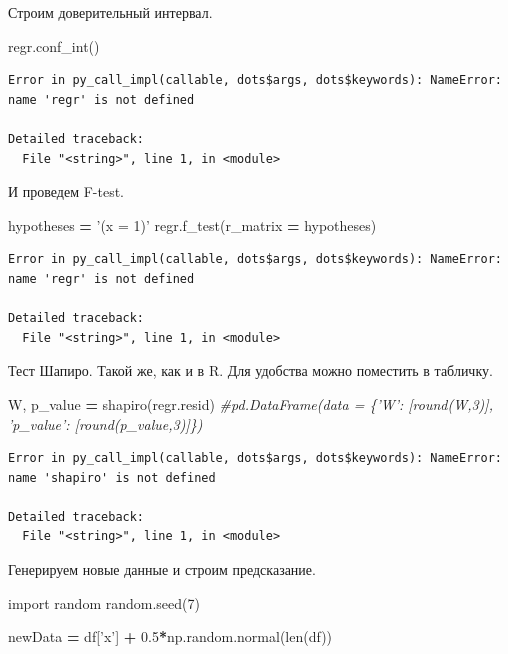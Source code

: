 \documentclass[]{book}
\newenvironment{Shaded}{\begin{snugshade}}{\end{snugshade}}
\newcommand{\BuiltInTok}[1]{#1}
\newcommand{\CommentTok}[1]{\textcolor[rgb]{0.56,0.35,0.01}{\textit{#1}}}
\newcommand{\DecValTok}[1]{\textcolor[rgb]{0.00,0.00,0.81}{#1}}
\newcommand{\FloatTok}[1]{\textcolor[rgb]{0.00,0.00,0.81}{#1}}
\newcommand{\ImportTok}[1]{#1}
\newcommand{\NormalTok}[1]{#1}
\newcommand{\OperatorTok}[1]{\textcolor[rgb]{0.81,0.36,0.00}{\textbf{#1}}}
\newcommand{\StringTok}[1]{\textcolor[rgb]{0.31,0.60,0.02}{#1}}
\begin{document}
Строим доверительный интервал.

\begin{Shaded}
\begin{Highlighting}[]
\NormalTok{regr.conf_int()}
\end{Highlighting}
\end{Shaded}

\begin{verbatim}
Error in py_call_impl(callable, dots$args, dots$keywords): NameError: name 'regr' is not defined

Detailed traceback: 
  File "<string>", line 1, in <module>
\end{verbatim}

И проведем F-test.

\begin{Shaded}
\begin{Highlighting}[]
\NormalTok{hypotheses }\OperatorTok{=} \StringTok{'(x = 1)'}
\NormalTok{regr.f_test(r_matrix }\OperatorTok{=}\NormalTok{ hypotheses)}
\end{Highlighting}
\end{Shaded}

\begin{verbatim}
Error in py_call_impl(callable, dots$args, dots$keywords): NameError: name 'regr' is not defined

Detailed traceback: 
  File "<string>", line 1, in <module>
\end{verbatim}

Тест Шапиро. Такой же, как и в R. Для удобства можно поместить в табличку.

\begin{Shaded}
\begin{Highlighting}[]
\NormalTok{W, p_value }\OperatorTok{=}\NormalTok{ shapiro(regr.resid)}
\CommentTok{#pd.DataFrame(data = \{'W': [round(W,3)], 'p_value': [round(p_value,3)]\})}
\end{Highlighting}
\end{Shaded}

\begin{verbatim}
Error in py_call_impl(callable, dots$args, dots$keywords): NameError: name 'shapiro' is not defined

Detailed traceback: 
  File "<string>", line 1, in <module>
\end{verbatim}

Генерируем новые данные и строим предсказание.

\begin{Shaded}
\begin{Highlighting}[]
\ImportTok{import}\NormalTok{ random}
\NormalTok{random.seed(}\DecValTok{7}\NormalTok{)}

\NormalTok{newData }\OperatorTok{=}\NormalTok{ df[}\StringTok{'x'}\NormalTok{] }\OperatorTok{+} \FloatTok{0.5}\OperatorTok{*}\NormalTok{np.random.normal(}\BuiltInTok{len}\NormalTok{(df))}
\end{Highlighting}
\end{Shaded}
\end{document}
